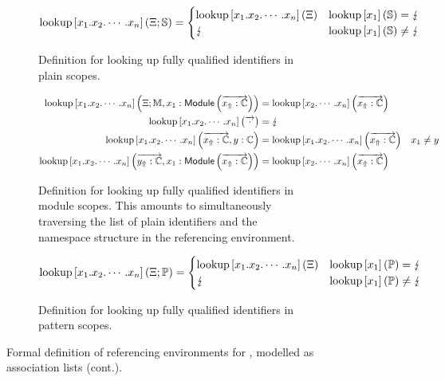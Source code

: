 \begin{figure}\ContinuedFloat
\begin{subfigure}{\linewidth}
\begin{equation*}
\operatorname{lookup}\left[x_1.x_2.\cdots.x_n\right]\left(\Xi; \mathbb{S}\right) =
\begin{cases}
\operatorname{lookup}\left[x_1.x_2.\cdots.x_n\right]\left(\Xi\right) & \operatorname{lookup}\left[x_1\right]\left(\mathbb{S}\right) = \lightning\\
\lightning & \operatorname{lookup}\left[x_1\right]\left(\mathbb{S}\right) \neq \lightning
\end{cases}
\end{equation*}
\caption{%
Definition for looking up fully qualified identifiers in plain scopes.
}
\end{subfigure}
\begin{subfigure}{\linewidth}
\begin{equation*}
\begin{aligned}
\operatorname{lookup}\left[x_1.x_2.\cdots.x_n\right]\left(\Xi; \mathbb{M}, x_1 : \mathsf{Module}\left(\overrightarrow{x_\Uparrow:\mathbb{C}}\right)\right) &= \operatorname{lookup}\left[x_2.\cdots.x_n\right]\left(\overrightarrow{x_\Uparrow:\mathbb{C}}\right)\\
\operatorname{lookup}\left[x_1.x_2.\cdots.x_n\right]\left(\overrightarrow{\cdot}\right) &= \lightning\\
\operatorname{lookup}\left[x_1.x_2.\cdots.x_n\right]\left(\overrightarrow{x_\Uparrow:\mathbb{C}}, y : \mathbb{C}\right) &= \operatorname{lookup}\left[x_1.x_2.\cdots.x_n\right]\left(\overrightarrow{x_\Uparrow:\mathbb{C}}\right) & x_1 \neq y\\
\operatorname{lookup}\left[x_1.x_2.\cdots.x_n\right]\left(\overrightarrow{y_\Uparrow:\mathbb{C}}, x_1: \mathsf{Module}\left(\overrightarrow{x_\Uparrow:\mathbb{C}}\right)\right) &= \operatorname{lookup}\left[x_2.\cdots.x_n\right]\left(\overrightarrow{x_\Uparrow:\mathbb{C}}\right)
\end{aligned}
\end{equation*}
\caption{%
Definition for looking up fully qualified identifiers in module scopes.
This amounts to simultaneously traversing the list of plain identifiers and the namespace structure in the referencing environment.
}
\end{subfigure}
\par\bigskip
\begin{subfigure}{\linewidth}
\begin{equation*}
\operatorname{lookup}\left[x_1.x_2.\cdots.x_n\right]\left(\Xi; \mathbb{P}\right) =
\begin{cases}
\operatorname{lookup}\left[x_1.x_2.\cdots.x_n\right]\left(\Xi\right) & \operatorname{lookup}\left[x_1\right]\left(\mathbb{P}\right) = \lightning\\
\lightning & \operatorname{lookup}\left[x_1\right]\left(\mathbb{P}\right) \neq \lightning
\end{cases}
\end{equation*}
\caption{%
Definition for looking up fully qualified identifiers in pattern scopes.
}
\end{subfigure}
\caption[]{%
Formal definition of referencing environments for \Beluga, modelled as association lists (cont.).
}
\end{figure}

